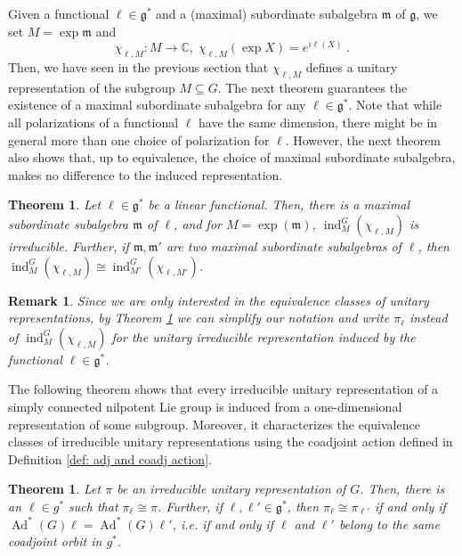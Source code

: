 \documentclass[pdflatex,sn-mathphys-num]{sn-jnl}
\theoremstyle{thmstyletwo}
\theoremstyle{thmstyleone}
\newtheorem{theorem}[definition]{Theorem}
\theoremstyle{thmstyletwo}
\newtheorem{remark}[definition]{Remark}
\newcommand{\fancyg}{\mathfrak{g}}
\newcommand{\fancym}{\mathfrak{m}}
\newcommand{\coadjoint}{\operatorname{Ad}^*}
\begin{document}
	Given a functional $\ell\in \fancyg^*$ and a (maximal) subordinate subalgebra $\fancym$ of $\fancyg$, we set $M = \operatorname{exp}\fancym$ and 
	\[\chi_{\ell,M}: M \to \mathbb{C}, \; \chi_{\ell,M}	(\operatorname{exp}X) = e^{i\ell(X)} \;.\]
	Then, we have seen in the previous section that $\chi_{\ell,M}$ defines a unitary representation of the subgroup $M \subseteq G$.
	The next theorem guarantees the existence of a maximal subordinate subalgebra for any $\ell \in \fancyg^*$. Note that while all polarizations of a functional $\ell$ have the same dimension, there might be in general more than one choice of polarization for $\ell$. However, the next theorem also shows that, up to equivalence, the choice of maximal subordinate subalgebra, makes no difference to the induced representation.
	\begin{theorem}\label{thm: existence of mss}
		Let $\ell\in \mathfrak{g}^*$ be a linear functional. Then, there is a maximal subordinate subalgebra $\fancym$ of $\ell$, and for $M = \exp(\fancym)$, $\operatorname{ind}_M^G(\chi_{\ell,M})$ is irreducible. Further, if $\fancym, \fancym'$ are two maximal subordinate subalgebras of $\ell$, then $\operatorname{ind}_M^G(\chi_{\ell,M}) \cong \operatorname{ind}_{M'}^G(\chi_{\ell,M'})$.
	\end{theorem}
	\begin{remark}
		Since we are only interested in the equivalence classes of unitary representations, by Theorem \ref{thm: existence of mss} we can simplify our notation and write $\pi_\ell$ instead of $\operatorname{ind}_M^G(\chi_{\ell,M})$ for the unitary irreducible representation induced by the functional $\ell \in \fancyg^*$.
	\end{remark}
	The following theorem shows that every irreducible unitary representation of a simply connected nilpotent Lie group is induced from a one-dimensional representation of some subgroup. Moreover, it characterizes the equivalence classes of irreducible unitary representations using the coadjoint action defined in Definition \ref{def: adj and coadj action}.
	\begin{theorem}\label{thm: eq of unireps with induced reps}
		Let $\pi$ be an irreducible unitary representation of $G$. Then, there is an $\ell \in g^*$ such that $\pi_\ell \cong \pi$. Further, if $\ell, \ell' \in \fancyg^*$, then $\pi_\ell \cong \pi_{\ell'}$ if and only if $\coadjoint (G)\ell=\coadjoint (G)\ell'$, i.e. if and only if $\ell$ and $\ell'$ belong to the same coadjoint orbit in $g^*$.
	\end{theorem}
\end{document}
